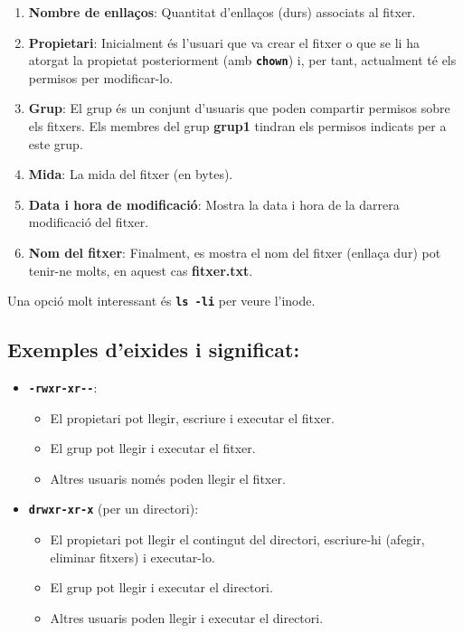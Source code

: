 \documentclass[
  a4paper,
]{article}
\providecommand{\tightlist}{%
  \setlength{\itemsep}{0pt}\setlength{\parskip}{0pt}}
\begin{document}
\begin{enumerate}
\def\labelenumi{\arabic{enumi}.}
\setcounter{enumi}{2}
\item
  \textbf{Nombre de enllaços}: Quantitat d'enllaços (durs) associats al
  fitxer.
\item
  \textbf{Propietari}: Inicialment és l'usuari que va crear el fitxer o
  que se li ha atorgat la propietat posteriorment (amb
  \textbf{\texttt{chown}}) i, per tant, actualment té els permisos per
  modificar-lo.
\item
  \textbf{Grup}: El grup és un conjunt d'usuaris que poden compartir
  permisos sobre els fitxers. Els membres del grup \textbf{grup1}
  tindran els permisos indicats per a este grup.
\item
  \textbf{Mida}: La mida del fitxer (en bytes).
\item
  \textbf{Data i hora de modificació}: Mostra la data i hora de la
  darrera modificació del fitxer.
\item
  \textbf{Nom del fitxer}: Finalment, es mostra el nom del fitxer
  (enllaça dur) pot tenir-ne molts, en aquest cas \textbf{fitxer.txt}.
\end{enumerate}

Una opció molt interessant és \textbf{\texttt{ls\ -li}} per veure
l'inode.

\subsection{Exemples d'eixides i
significat:}\label{exemples-deixides-i-significat}

\begin{itemize}
\tightlist
\item
  \textbf{\texttt{-rwxr-xr-\/-}}:

  \begin{itemize}
  \tightlist
  \item
    El propietari pot llegir, escriure i executar el fitxer.
  \item
    El grup pot llegir i executar el fitxer.
  \item
    Altres usuaris només poden llegir el fitxer.
  \end{itemize}
\item
  \textbf{\texttt{drwxr-xr-x}} (per un directori):

  \begin{itemize}
  \tightlist
  \item
    El propietari pot llegir el contingut del directori, escriure-hi
    (afegir, eliminar fitxers) i executar-lo.
  \item
    El grup pot llegir i executar el directori.
  \item
    Altres usuaris poden llegir i executar el directori.
  \end{itemize}
\end{itemize}
\end{document}
